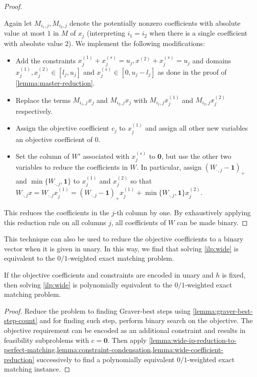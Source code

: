 \documentclass[a4paper,UKenglish,cleveref,thm-restate]{lipics-v2021}
\newcommand{\veczero}{\mathbf0}
\newcommand{\vecone}{\mathbf1}
\begin{document}
\begin{proof}
\begin{figure}[H]
        \label{fig:wide-coefficient-reduction}
    \end{figure}
    Again let $M_{i_1,j},M_{i_2,j}$ denote the potentially nonzero coefficients with absolute value at most $1$ in $M$ of $x_j$ (interpreting $i_1=i_2$ when there is a single coefficient with absolute value $2$). We implement the following modifications:
    \begin{itemize}
        \item Add the constraints $x_j^{(1)}+x_j^{(s)}=u_j,x^{(2)}+x_j^{(s)}=u_j$ and domains $x_j^{(1)},x_j^{(2)}\in[l_j,u_j]$ and $x_j^{(s)}\in[0,u_j-l_j]$ as done in the proof of \cref{lemma:master-reduction}.
        \item Replace the terms $M_{i_1,j}x_j$ and $M_{i_2,j}x_j$ with $M_{i_1,j}x_j^{(1)}$ and $M_{i_2,j}x_j^{(2)}$ respectively.
        \item Assign the objective coefficient $c_j$ to $x_j^{(1)}$ and assign all other new variables an objective coefficient of $0$.
        \item Set the column of $W'$ associated with $x_j^{(s)}$ to $\veczero$, but use the other two variables to reduce the coefficients in $W$. In particular, assign $(W_{\cdot,j}-\vecone)_+$ and $\min\{W_{\cdot,j},\vecone\}$ to $x_j^{(1)}$ and $x_j^{(2)}$ so that $W_{\cdot,j}x=W_{\cdot,j}x_j^{(1)}=(W_{\cdot,j}-\vecone)_+x_j^{(1)}+\min\{W_{\cdot,j},\vecone\}x_j^{(2)}$.
    \end{itemize}
    
    This reduces the coefficients in the $j$-th column by one. By exhaustively applying this reduction rule on all columns $j$, all coefficients of $W$ can be made binary.
\end{proof}

This technique can also be used to reduce the objective coefficients to a binary vector when it is given in unary. In this way, we find that solving \cref{ilp:wide} is equivalent to the $0/1$-weighted exact matching problem.

\begin{proposition}
    If the objective coefficients and constraints are encoded in unary and $h$ is fixed, then solving \cref{ilp:wide} is polynomially equivalent to the $0/1$-weighted exact matching problem.
    \label{thm:wide-ip-exact-matching-equivalence}
\end{proposition}

\begin{proof}
    Reduce the problem to finding Graver-best steps using \cref{lemma:graver-best-step-count} and for finding such step, perform binary search on the objective. The objective requirement can be encoded as an additional constraint and results in feasibility subproblems with $c=\veczero$. Then apply \cref{lemma:wide-ip-reduction-to-perfect-matching,lemma:constraint-condensation,lemma:wide-coefficient-reduction} successively to find a polynomially equivalent $0/1$-weighted exact matching instance.
\end{proof}
\end{document}
